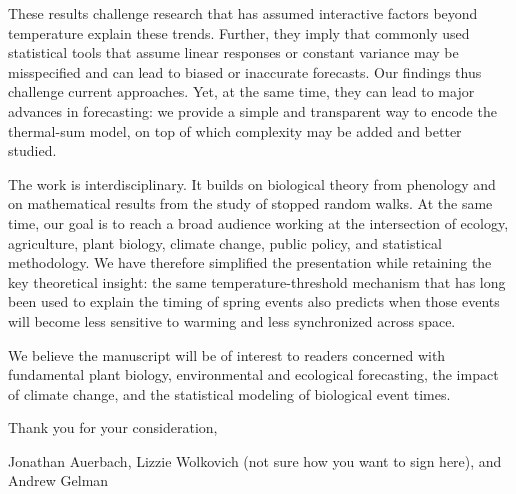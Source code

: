These results challenge research that has assumed interactive factors beyond temperature explain these trends. Further, they imply that commonly used statistical tools that assume linear responses or constant variance may be misspecified and can lead to biased or inaccurate forecasts. Our findings thus challenge current approaches. Yet, at the same time, they can lead to major advances in forecasting: we provide a simple and transparent way to encode the thermal-sum model, on top of which complexity may be added and better studied.

The work is interdisciplinary. It builds on biological theory from phenology and on mathematical results from the study of stopped random walks. At the same time, our goal is to reach a broad audience working at the intersection of ecology, agriculture, plant biology, climate change, public policy, and statistical methodology. We have therefore simplified the presentation while retaining the key theoretical insight: the same temperature-threshold mechanism that has long been used to explain the timing of spring events also predicts when those events will become less sensitive to warming and less synchronized across space.

We believe the manuscript will be of interest to readers concerned with fundamental plant biology, environmental and ecological forecasting, the impact of climate change, and the statistical modeling of biological event times.

Thank you for your consideration,

Jonathan Auerbach, Lizzie Wolkovich (not sure how you want to sign here), and Andrew Gelman
